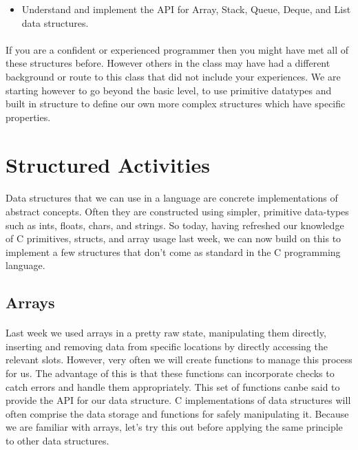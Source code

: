 \documentclass[10pt, a4paper, twosize]{article}
\begin{document}
\begin{itemize}
\item Understand and implement the API for Array, Stack, Queue, Deque, and List data structures.
\end{itemize}

\paragraph{} If you are a confident or experienced programmer then you might have met all of these structures before. However others in the class may have had a different background or route to this class that did not include your experiences. We are starting however to go beyond the basic level, to use primitive datatypes and built in structure to define our own more complex structures which have specific properties.

\section{Structured Activities}

\paragraph{} Data structures that we can use in a language are concrete implementations of abstract concepts. Often they are constructed using simpler, primitive data-types such as ints, floats, chars, and strings. So today, having refreshed our knowledge of C primitives, structs, and array usage last week, we can now build on this to implement a few structures that don't come as standard in the C programming language.

\subsection{Arrays}
\paragraph{} Last week we used arrays in a pretty raw state, manipulating them directly, inserting and removing data from specific locations by directly accessing the relevant slots. However, very often we will create functions to manage this process for us. The advantage of this is that these functions can incorporate checks to catch errors and handle them appropriately. This set of functions canbe said to provide the API for our data structure. C implementations of data structures will often comprise the data storage and functions for safely manipulating it. Because we are familiar with arrays, let's try this out before applying the same principle to other data structures.
\end{document}
